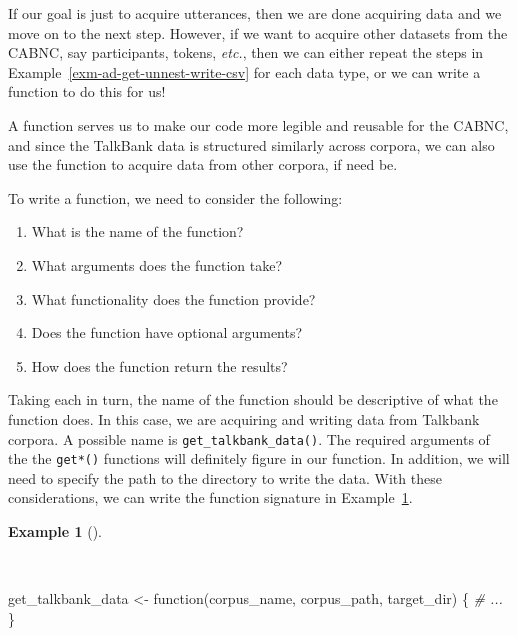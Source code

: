 \documentclass[
  letterpaper,
  DIV=11,
  numbers=noendperiod]{scrreprt}
\newenvironment{Shaded}{\begin{snugshade}}{\end{snugshade}}
\newcommand{\CommentTok}[1]{\textcolor[rgb]{0.00,0.00,0.00}{\textit{#1}}}
\newcommand{\ControlFlowTok}[1]{\textcolor[rgb]{0.00,0.00,0.00}{#1}}
\newcommand{\NormalTok}[1]{\textcolor[rgb]{0.00,0.00,0.00}{#1}}
\newcommand{\OtherTok}[1]{\textcolor[rgb]{0.00,0.00,0.00}{#1}}
\providecommand{\tightlist}{%
  \setlength{\itemsep}{0pt}\setlength{\parskip}{0pt}}\usepackage{longtable,booktabs,array}
\theoremstyle{definition}
\newtheorem{example}{Example}[chapter]
\theoremstyle{remark}
\begin{document}
If our goal is just to acquire utterances, then we are done acquiring
data and we move on to the next step. However, if we want to acquire
other datasets from the CABNC, say participants, tokens, \emph{etc.},
then we can either repeat the steps in
Example~\ref{exm-ad-get-unnest-write-csv} for each data type, or we can
write a function to do this for us!

A function serves us to make our code more legible and reusable for the
CABNC, and since the TalkBank data is structured similarly across
corpora, we can also use the function to acquire data from other
corpora, if need be.

To write a function, we need to consider the following:

\begin{enumerate}
\def\labelenumi{\arabic{enumi}.}
\tightlist
\item
  What is the name of the function?
\item
  What arguments does the function take?
\item
  What functionality does the function provide?
\item
  Does the function have optional arguments?
\item
  How does the function return the results?
\end{enumerate}

Taking each in turn, the name of the function should be descriptive of
what the function does. In this case, we are acquiring and writing data
from Talkbank corpora. A possible name is
\texttt{get\_talkbank\_data()}. The required arguments of the the
\texttt{get*()} functions will definitely figure in our function. In
addition, we will need to specify the path to the directory to write the
data. With these considerations, we can write the function signature in
Example~\ref{exm-ad-get-talkbank-data-1}.

\begin{example}[]\protect\hypertarget{exm-ad-get-talkbank-data-1}{}\label{exm-ad-get-talkbank-data-1}

~

\begin{Shaded}
\begin{Highlighting}[]
\NormalTok{get\_talkbank\_data }\OtherTok{\textless{}{-}} \ControlFlowTok{function}\NormalTok{(corpus\_name, corpus\_path, target\_dir) \{}
  \CommentTok{\# ...}
\NormalTok{\}}
\end{Highlighting}
\end{Shaded}

\end{example}
\end{document}
